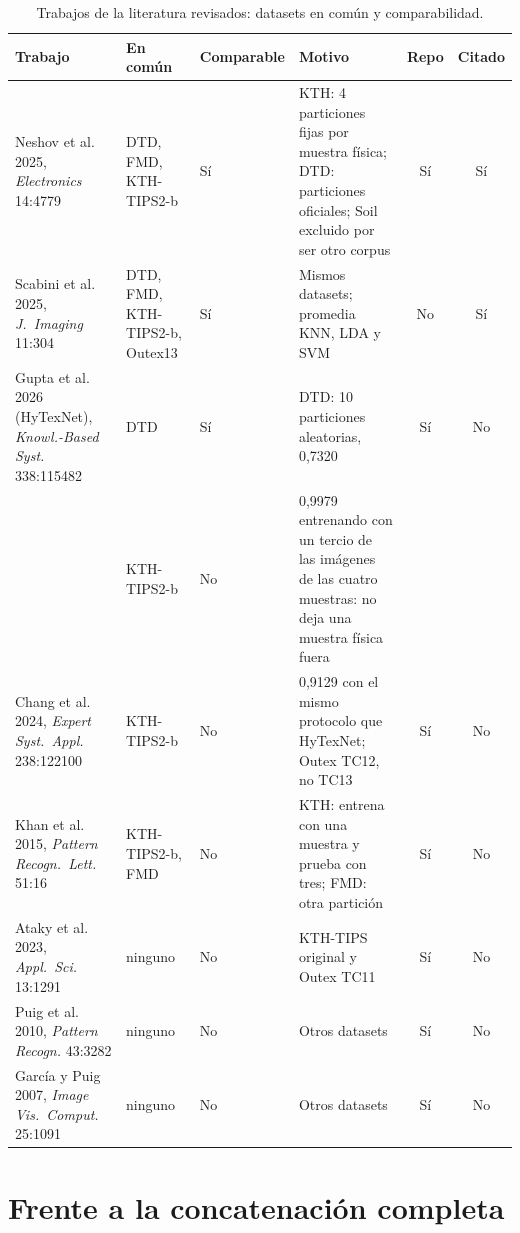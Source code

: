 \documentclass[11pt,a4paper]{article}
\begin{document}
\begin{table}[H]
\centering
\caption{Trabajos de la literatura revisados: datasets en común y
comparabilidad.}
\label{tab:literatura}
\footnotesize
\setlength{\tabcolsep}{4pt}
\begin{tabular}{@{}>{\raggedright}p{3.3cm}>{\raggedright}p{2.6cm}>{\raggedright}p{1.4cm}>{\raggedright}p{4.9cm}cc@{}}
\toprule
Trabajo & En común & Compa\-rable & Motivo & Repo & Citado \\
\midrule
Neshov et al. 2025, \emph{Electronics} 14:4779 & DTD, FMD, KTH-TIPS2-b & Sí & KTH: 4 particiones fijas por muestra física; DTD: particiones oficiales; Soil excluido por ser otro corpus & Sí & Sí \\
\addlinespace
Scabini et al. 2025, \emph{J.\ Imaging} 11:304 & DTD, FMD, KTH-TIPS2-b, Outex13 & Sí & Mismos datasets; promedia KNN, LDA y SVM & No & Sí \\
\addlinespace
Gupta et al. 2026 (HyTexNet), \emph{Knowl.-Based Syst.} 338:115482 & DTD & Sí & DTD: 10 particiones aleatorias, 0,7320 & Sí & No \\
 & KTH-TIPS2-b & No & 0,9979 entrenando con un tercio de las imágenes de las cuatro muestras: no deja una muestra física fuera & & \\
\addlinespace
Chang et al. 2024, \emph{Expert Syst.\ Appl.} 238:122100 & KTH-TIPS2-b & No & 0,9129 con el mismo protocolo que HyTexNet; Outex TC12, no TC13 & Sí & No \\
\addlinespace
Khan et al. 2015, \emph{Pattern Recogn.\ Lett.} 51:16 & KTH-TIPS2-b, FMD & No & KTH: entrena con una muestra y prueba con tres; FMD: otra partición & Sí & No \\
\addlinespace
Ataky et al. 2023, \emph{Appl.\ Sci.} 13:1291 & ninguno & No & KTH-TIPS original y Outex TC11 & Sí & No \\
\addlinespace
Puig et al. 2010, \emph{Pattern Recogn.} 43:3282 & ninguno & No & Otros datasets & Sí & No \\
\addlinespace
García y Puig 2007, \emph{Image Vis.\ Comput.} 25:1091 & ninguno & No & Otros datasets & Sí & No \\
\bottomrule
\end{tabular}
\end{table}

\section{Frente a la concatenación completa}
\end{document}
